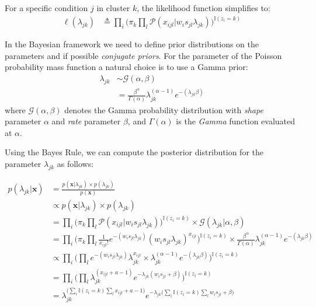 For a specific condition $j$ in cluster $k$, the likelihood function simplifies to:
\begin{equation} \label{poisson-log-lin-mm-jk-app}
  \begin{split}
	\ell(\lambda_{jk}) & \triangleq \prod_{i} \bigg( \pi_{k} \prod_{l} \mathcal{P}(x_{ijl} | w_{i}s_{jl} \lambda_{jk})\bigg)^{\mathbb{I}(z_{i}=k)}
  \end{split}
\end{equation}

In the Bayesian framework we need to define prior distributions on the parameters and if possible \emph{conjugate priors}. For the parameter of the Poisson probability mass function a natural choice is to use a Gamma prior:
\begin{equation} \label{poisson-prior-mm-app}
  \begin{split}
  \lambda_{jk} & \sim \mathcal{G}(\alpha, \beta) \\
  	& = \frac{\beta^{\alpha}}{\Gamma(\alpha)}\lambda_{jk}^{(\alpha-1)} e^{-(\lambda_{jk}\beta)}
    \end{split}
\end{equation}
where $\mathcal{G}(\alpha, \beta)$ denotes the Gamma probability distribution with \emph{shape} parameter $\alpha$ and \emph{rate} parameter $\beta$, and $\Gamma(\alpha)$ is the \emph{Gamma} function evaluated at $\alpha$.

Using the Bayes Rule, we can compute the posterior distribution for the parameter $\lambda_{jk}$ as follows:

\begin{equation} \label{posterior-poisson-bayes-rule-app}
  \begin{split}
  	p(\lambda_{jk} | \mathbf{x}) & = \frac{p(\mathbf{x}| \lambda_{jk}) \times p(\lambda_{jk})}{p(\mathbf{x})} \\
  		& \propto p(\mathbf{x}| \lambda_{jk}) \times p(\lambda_{jk}) \\
  		& = \prod_{i} \bigg(\pi_{k} \prod_{l} \mathcal{P}(x_{ijl} | w_{i}s_{jl} \lambda_{jk})\bigg)^{\mathbb{I}(z_{i}=k)} \times \mathcal{G}(\lambda_{jk}|\alpha, \beta) \\
  		& = \prod_{i} \bigg(\pi_{k} \prod_{l} \frac{1}{x_{ijl}!} e^{-(w_{i}s_{jl}\lambda_{jk})} (w_{i}s_{jl}\lambda_{jk})^{x_{ijl}}\bigg)^{\mathbb{I}(z_{i}=k)} \times \frac{\beta^{\alpha}}{\Gamma(\alpha)}\lambda_{jk}^{(\alpha-1)} e^{-(\lambda_{jk}\beta)} \\
		& \propto \prod_{i} \bigg(\prod_{l} e^{-(w_{i}s_{jl}\lambda_{jk})} \lambda_{jk}^{x_{ijl}} \times \lambda_{jk}^{(\alpha-1)} e^{-(\lambda_{jk}\beta)}\bigg)^{\mathbb{I}(z_{i}=k)} \\
		& = \prod_{i} \bigg(\prod_{l} \lambda_{jk}^{(x_{ijl} + a -1)} e^{-\lambda_{jk}(w_{i}s_{jl} + \beta)}\bigg)^{\mathbb{I}(z_{i}=k)} \\
		& = \lambda_{jk}^{\big(\sum\limits_{i} \mathbb{I}(z_{i}=k) \sum\limits_{l} x_{ijl} + a -1\big)} e^{-\lambda_{jk}\big(\sum\limits_{i} \mathbb{I}(z_{i}=k) \sum\limits_{l} w_{i}s_{jl} + \beta \big)}
  \end{split}
\end{equation}


